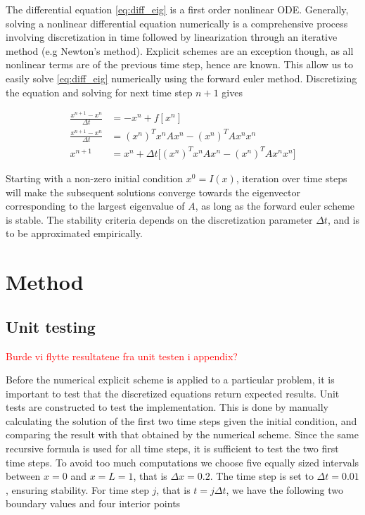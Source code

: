 \documentclass[12pt]{extarticle}
\begin{document}
The differential equation \eqref{eq:diff_eig} is a first order nonlinear ODE. Generally, solving a nonlinear differential equation numerically is a comprehensive process involving discretization in time followed by linearization through an iterative method (e.g Newton's method). Explicit schemes are an exception though, as all nonlinear terms are of the previous time step, hence are known. This allow us to easily solve \eqref{eq:diff_eig} numerically using the forward euler method. Discretizing the equation and solving for next time step $n+1$ gives

\begin{align*}
	\frac{x^{n+1}-x^n}{\Delta t} &= -x^n + f[x^n] \\
	\frac{x^{n+1}-x^n}{\Delta t} &= (x^n)^T x^n A x^n - (x^n)^T A x^n x^n \\
	x^{n+1} &= x^n + \Delta t\big[ (x^n)^T x^n A x^n - (x^n)^T A x^n x^n \big]
\end{align*}

Starting with a non-zero initial condition $x^0 = I(x)$, iteration over time steps will make the subsequent solutions converge towards the eigenvector corresponding to the largest eigenvalue of $A$, as long as the forward euler scheme is stable. The stability criteria depends on the discretization parameter $\Delta t$, and is to be approximated empirically. 



\section{Method}
\subsection*{Unit testing}
\textcolor{red}{Burde vi flytte resultatene fra unit testen i appendix?}

Before the numerical explicit scheme is applied to a particular problem, it is important to test that the discretized equations return expected results. Unit tests are constructed to test the implementation. This is done by manually calculating the solution of the first two time steps given the initial condition, and comparing the result with that obtained by the numerical scheme. Since the same recursive formula is used for all time steps, it is sufficient to test the two first time steps. To avoid too much computations we choose five equally sized intervals between $x=0$ and $x=L=1$, that is $\Delta x = 0.2$. The time step is set to $\Delta t = 0.01$, ensuring stability.
For time step $j$, that is $t=j\Delta t$, we have the following two boundary values and four interior points
\end{document}
